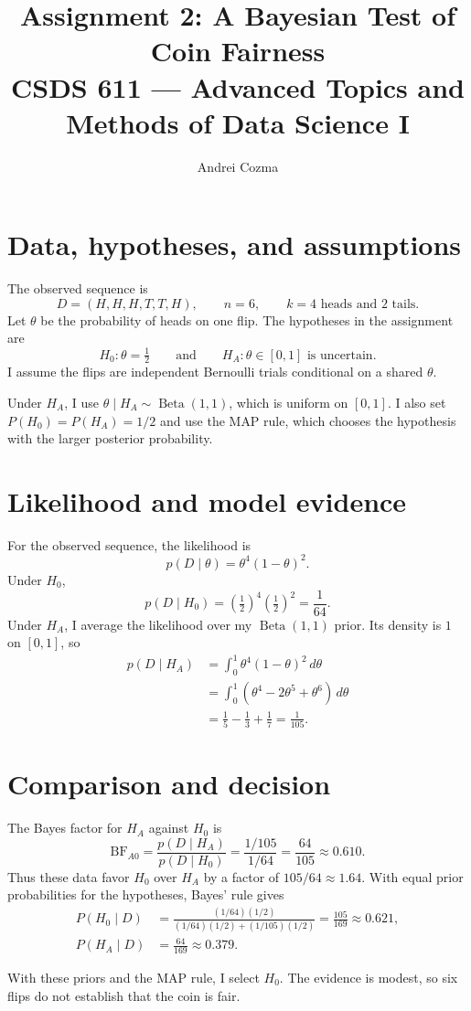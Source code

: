 \documentclass[11pt,letterpaper]{article}
\title{%
  Assignment 2: A Bayesian Test of Coin Fairness\\[0.4em]
  {\large CSDS 611 --- Advanced Topics and Methods of Data Science I}%
}
\author{Andrei Cozma}
\date{}
\begin{document}
\maketitle

\section*{Data, hypotheses, and assumptions}

The observed sequence is
\[
  D=(H,H,H,T,T,H),
  \qquad n=6,\qquad k=4\text{ heads and }2\text{ tails}.
\]
Let $\theta$ be the probability of heads on one flip.
The hypotheses in the
assignment are
\[
  H_0:\theta=\tfrac12
  \qquad\text{and}\qquad
  H_A:\theta\in[0,1]\text{ is uncertain}.
\]
I assume the flips are independent Bernoulli trials conditional on a shared
$\theta$.

Under $H_A$, I use $\theta\mid H_A\sim\operatorname{Beta}(1,1)$, which is
uniform on $[0,1]$.
I also set $P(H_0)=P(H_A)=1/2$ and use the MAP rule, which
chooses the hypothesis with the larger posterior probability.

\section*{Likelihood and model evidence}

For the observed sequence, the likelihood is
\[
  p(D\mid\theta)=\theta^4(1-\theta)^2.
\]
Under $H_0$,
\[
  p(D\mid H_0)
  =\left(\tfrac12\right)^4\left(\tfrac12\right)^2
  =\frac{1}{64}.
\]
Under $H_A$, I average the likelihood over my $\operatorname{Beta}(1,1)$ prior.
Its density is $1$ on $[0,1]$, so
\begin{align*}
  p(D\mid H_A)
   & =\int_0^1 \theta^4(1-\theta)^2\,d\theta          \\
   & =\int_0^1 (\theta^4-2\theta^5+\theta^6)\,d\theta \\
   & =\frac15-\frac13+\frac17
  =\frac{1}{105}.
\end{align*}
\section*{Comparison and decision}

The Bayes factor for $H_A$ against $H_0$ is
\[
  \mathrm{BF}_{A0}
  =\frac{p(D\mid H_A)}{p(D\mid H_0)}
  =\frac{1/105}{1/64}
  =\frac{64}{105}\approx0.610.
\]
Thus these data favor $H_0$ over $H_A$ by a factor of $105/64\approx1.64$.
With equal prior probabilities for the hypotheses, Bayes' rule gives
\begin{align*}
  P(H_0\mid D)
   & =\frac{(1/64)(1/2)}{(1/64)(1/2)+(1/105)(1/2)}
  =\frac{105}{169}\approx0.621,                    \\
  P(H_A\mid D)
   & =\frac{64}{169}\approx0.379.
\end{align*}

With these priors and the MAP rule, I select $H_0$.
The evidence is modest, so
six flips do not establish that the coin is fair.
\end{document}
